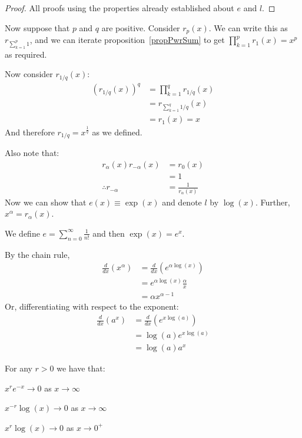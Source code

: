 \documentclass[../Main.tex]{subfiles}
\begin{document}
\begin{proof}
    All proofs using the properties already established about $e$ and $l$.
\end{proof}
Now suppose that $p$ and $q$ are positive. Consider $r_p(x)$. We can write this as $r_{\sum_{k=1}^p 1}$, and we can iterate proposition~\ref{propPwrSum} to get $\prod_{k = 1}^p r_1(x) = x^p$ as required.\par
Now consider $r_{1/q}(x)$:
\begin{align*}
    \left(r_{1/q}(x)\right)^q &= \prod_{k = 1}^q r_{1/q}(x) \\
    &= r_{\sum_{k = 1}^q 1/q}(x) \\
    &= r_1(x) = x
\end{align*}
And therefore $r_{1/q} = x^{\frac{1}{q}}$ as we defined.\par
Also note that:
\begin{align*}
    r_\alpha(x) r_{-\alpha}(x) &= r_0(x) \\
    &=1 \\
    \therefore r_{-\alpha} &= \frac{1}{r_\alpha(x)}
\end{align*}
Now we can show that $e(x) \equiv \exp(x)$ and denote $l$ by $\log(x)$. Further, $x^\alpha = r_\alpha(x)$.\par
We define $e = \sum_{n=0}^\infty \frac{1}{n!}$ and then $\exp(x) = e^x$.\par
By the chain rule,
\begin{align*}
    \frac{d}{dx}(x^\alpha) &= \frac{d}{dx}(e^{\alpha \log(x)}) \\
    &= e^{\alpha \log(x)} \frac{\alpha}{x} \\
    &= \alpha x^{\alpha - 1}
\end{align*}
Or, differentiating with respect to the exponent:
\begin{align*}
    \frac{d}{dx} (a^x) &= \frac{d}{dx}(e^{x \log(a)}) \\
    &= \log(a) e^{x \log(a)} \\
    &= \log(a) a^x
\end{align*}
\begin{propositions}{
        For any $r > 0$ we have that:
        \label{propsExpLimits}
    }
    \item $x^r e^{-x} \to 0$ as $x \to \infty$
    \item $x^{-r} \log(x) \to 0$ as $x \to \infty$
    \item $x^r \log(x) \to 0$ as $x \to 0^+$
\end{propositions}
\end{document}
